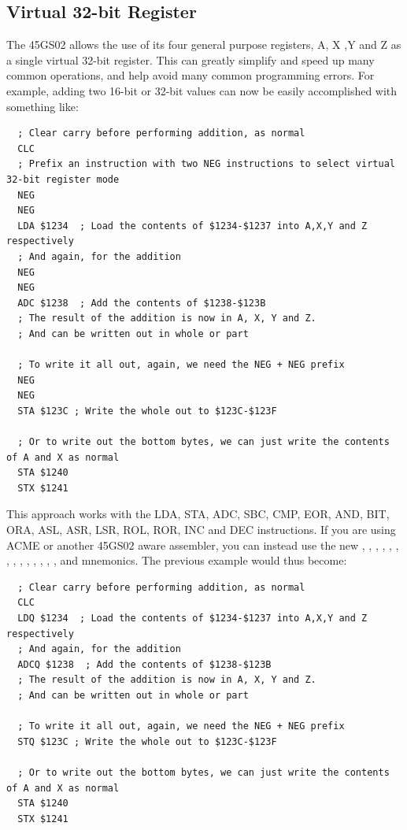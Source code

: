 \subsection{Virtual 32-bit Register}

The 45GS02 allows the use of its four general purpose registers, A, X ,Y and Z as a single virtual 32-bit register. This can greatly
simplify and speed up many common operations, and help avoid many common programming errors.
For example, adding two 16-bit or 32-bit values can now be easily accomplished with something like:

\begin{tcolorbox}[colback=black,coltext=white]
\verbatimfont{\codefont}
\begin{verbatim}
  ; Clear carry before performing addition, as normal
  CLC
  ; Prefix an instruction with two NEG instructions to select virtual 32-bit register mode
  NEG
  NEG
  LDA $1234  ; Load the contents of $1234-$1237 into A,X,Y and Z respectively
  ; And again, for the addition
  NEG
  NEG
  ADC $1238  ; Add the contents of $1238-$123B
  ; The result of the addition is now in A, X, Y and Z.
  ; And can be written out in whole or part

  ; To write it all out, again, we need the NEG + NEG prefix
  NEG
  NEG
  STA $123C ; Write the whole out to $123C-$123F

  ; Or to write out the bottom bytes, we can just write the contents of A and X as normal
  STA $1240
  STX $1241
\end{verbatim}
\end{tcolorbox}

This approach works with the LDA, STA, ADC, SBC, CMP, EOR, AND, BIT, ORA, ASL, ASR, LSR, ROL, ROR, INC and DEC instructions.
If you are using ACME or another 45GS02 aware assembler, you can instead use the new , , ,
, , , , , , , , , , ,  and 
mnemonics. The previous example would thus become:

\begin{tcolorbox}[colback=black,coltext=white]
\verbatimfont{\codefont}
\begin{verbatim}
  ; Clear carry before performing addition, as normal
  CLC
  LDQ $1234  ; Load the contents of $1234-$1237 into A,X,Y and Z respectively
  ; And again, for the addition
  ADCQ $1238  ; Add the contents of $1238-$123B
  ; The result of the addition is now in A, X, Y and Z.
  ; And can be written out in whole or part

  ; To write it all out, again, we need the NEG + NEG prefix
  STQ $123C ; Write the whole out to $123C-$123F

  ; Or to write out the bottom bytes, we can just write the contents of A and X as normal
  STA $1240
  STX $1241
\end{verbatim}
\end{tcolorbox}

